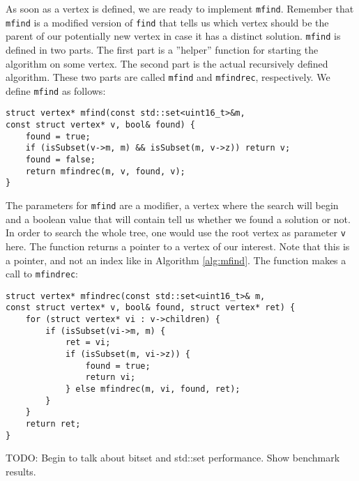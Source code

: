 As soon as a vertex is defined, we are ready to implement \texttt{mfind}.
Remember that \texttt{mfind} is a modified version of \texttt{find} that tells
us which vertex should be the parent of our potentially new vertex in case it
has a distinct solution.
\texttt{mfind} is defined in two parts. The first part is a ''helper'' function
for starting the algorithm on some vertex. The second part is the actual
recursively defined algorithm. These two parts are called \texttt{mfind} and
\texttt{mfindrec}, respectively. We define \texttt{mfind} as follows:
\newpage
\begin{verbatim}
struct vertex* mfind(const std::set<uint16_t>&m,
const struct vertex* v, bool& found) {
    found = true;
    if (isSubset(v->m, m) && isSubset(m, v->z)) return v;
    found = false;
    return mfindrec(m, v, found, v);
}
\end{verbatim}
The parameters for \texttt{mfind} are a modifier, a vertex where the search
will begin and a boolean value that will contain tell us whether we found a
solution or not.
In order to search the whole tree, one would use the root vertex as parameter
\texttt{v} here. The function returns a pointer to a vertex of our interest.
Note that this is a pointer, and not an index like in Algorithm
\ref{alg:mfind}. The function makes a call to \texttt{mfindrec}:
\begin{verbatim}
struct vertex* mfindrec(const std::set<uint16_t>& m,
const struct vertex* v, bool& found, struct vertex* ret) {
    for (struct vertex* vi : v->children) {
        if (isSubset(vi->m, m) {
            ret = vi;
            if (isSubset(m, vi->z)) {
                found = true;
                return vi;
            } else mfindrec(m, vi, found, ret);
        }
    }
    return ret;
}
\end{verbatim}
TODO: Begin to talk about bitset and std::set performance. Show benchmark
results.








\newpage
\begin{comment}
struct vertex* findrec(const std::set<uint16_t>& m, struct vertex* v) {
    for (int i = 0; i < v->children.size(); i++) {
        struct vertex* child = v->children[i];
        if (isSubset(child->m, m) {
            if (isSubset(m, child->z))
                return child;
            else
                findrec(m, child);
        }
    }
    return 0;
}
The function \texttt{isSubset} is just a one-line function that calls
\texttt{std::includes(...)}. One might notice that we do not check if the input
vertex contains the solution to the input modifier. However, we \emph{do} check
this in \texttt{find}:
struct vertex* find(const std::set<uint16_t>& m, struct vertex* v) {
    if (v == 0) return 0;
    if (isSubset(v->m, m) && isSubset(m, v->z) return v;
    return findrec(m, v);
}
\end{comment}

